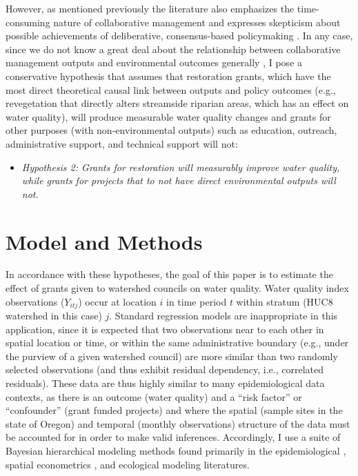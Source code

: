 \documentclass[11pt,a4paper,titlepage]{article}
\begin{document}
However, as mentioned previously the literature also emphasizes the time-consuming nature of collaborative management \parencite[e.g.,][]{margerum2011,ansell2008,imperial2005} and expresses skepticism about possible achievements of deliberative, consensus-based policymaking \parencite{coglianese2003, gunton2003}. In any case, since we do not know a great deal about the relationship between collaborative management outputs and environmental outcomes generally \parencite{carr2012,koontz2006, newig2009}, I pose a conservative hypothesis that assumes that restoration grants, which have the most direct theoretical causal link between outputs and policy outcomes (e.g., revegetation that directly alters streamside riparian areas, which has an effect on water quality), will produce measurable water quality changes and grants for other purposes (with non-environmental outputs) such as education, outreach, administrative support, and technical support will not:

\begin{itemize}
\item \textit{Hypothesis 2: Grants for restoration will measurably improve water quality, while grants for projects that to not have direct environmental outputs will not.}
\end{itemize}


\section*{Model and Methods}

In accordance with these hypotheses, the goal of this paper is to estimate the effect of grants given to watershed councils on water quality. Water quality index observations ($Y_{itj}$) occur at location $i$ in time period $t$ within stratum (HUC8 watershed in this case) $j$. Standard regression models are inappropriate in this application, since it is expected that two observations near to each other in spatial location or time, or within the same administrative boundary (e.g., under the purview of a given watershed council) are more similar than two randomly selected observations (and thus exhibit residual dependency, i.e., correlated residuals). These data are thus highly similar to many epidemiological data contexts, as there is an outcome (water quality) and a “risk factor” or “confounder” (grant funded projects) and where the spatial (sample sites in the state of Oregon) and temporal (monthly observations) structure of the data must be accounted for in order to make valid inferences. Accordingly, I use a suite of Bayesian hierarchical modeling methods found primarily in the epidemiological \parencite{cameletti2013,blangiardo2010,blangiardo2013}, spatial econometrics \parencite{bivand2008,bivand2013,gomez-rubio2014}, and ecological modeling \parencite{cosandey-godin2014, clark2005,clark2006,wikle2003,cressie2009,wikle2010,xu2007,cressie2011} literatures. 
\end{document}
